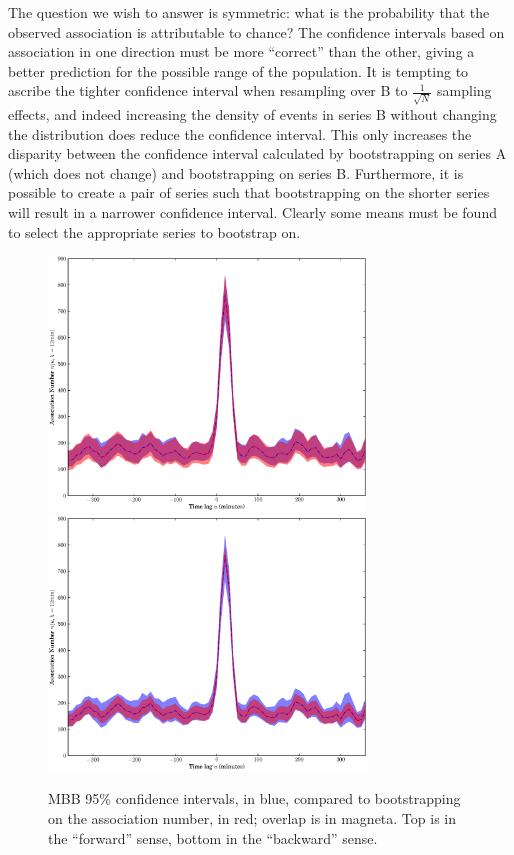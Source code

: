 \documentclass[letterpaper,11pt]{article}
\begin{document}
The question we wish to answer is symmetric: what is the probability
that the observed association is attributable to chance? The
confidence intervals based on association in one direction must be
more ``correct'' than the other, giving a better prediction for the
possible range of the population. It is tempting to ascribe the
tighter confidence interval when resampling over B to
$\frac{1}{\sqrt{N}}$ sampling effects, and indeed increasing the
density of events in series B without changing the distribution does
reduce the confidence interval. This only increases the disparity
between the confidence interval calculated by bootstrapping on series
A (which does not change) and bootstrapping on series B. Furthermore,
it is possible to create a pair of series such that bootstrapping on
the shorter series will result in a narrower confidence
interval. Clearly some means must be found to select the appropriate
series to bootstrap on.

\begin{figure}
\begin{center}
\includegraphics[width=0.75\textwidth]{figures/mbb_forward.eps}\\
\includegraphics[width=0.75\textwidth]{figures/mbb_reverse.eps}
\caption{\label{fig:mbb_comparison}MBB 95\% confidence intervals, in
blue, compared to bootstrapping on the association number, in red;
overlap is in magneta. Top is in the ``forward'' sense, bottom in the
``backward'' sense.}
\end{center}
\end{figure}
\end{document}
